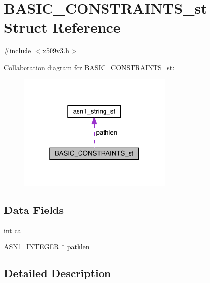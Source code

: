 \hypertarget{struct_b_a_s_i_c___c_o_n_s_t_r_a_i_n_t_s__st}{}\section{B\+A\+S\+I\+C\+\_\+\+C\+O\+N\+S\+T\+R\+A\+I\+N\+T\+S\+\_\+st Struct Reference}
\label{struct_b_a_s_i_c___c_o_n_s_t_r_a_i_n_t_s__st}


{\ttfamily \#include $<$x509v3.\+h$>$}



Collaboration diagram for B\+A\+S\+I\+C\+\_\+\+C\+O\+N\+S\+T\+R\+A\+I\+N\+T\+S\+\_\+st\+:\nopagebreak
\begin{figure}[H]
\begin{center}
\leavevmode
\includegraphics[width=217pt]{struct_b_a_s_i_c___c_o_n_s_t_r_a_i_n_t_s__st__coll__graph}
\end{center}
\end{figure}
\subsection*{Data Fields}
\begin{DoxyCompactItemize}
\item 
int \hyperlink{struct_b_a_s_i_c___c_o_n_s_t_r_a_i_n_t_s__st_a2fac671580d5a7a3318d081ac0ac5958}{ca}
\item 
\hyperlink{crypto_2ossl__typ_8h_af4335399bf9774cb410a5e93de65998b}{A\+S\+N1\+\_\+\+I\+N\+T\+E\+G\+ER} $\ast$ \hyperlink{struct_b_a_s_i_c___c_o_n_s_t_r_a_i_n_t_s__st_a943b2c1be19d99b8291ebd26fca75952}{pathlen}
\end{DoxyCompactItemize}


\subsection{Detailed Description}


